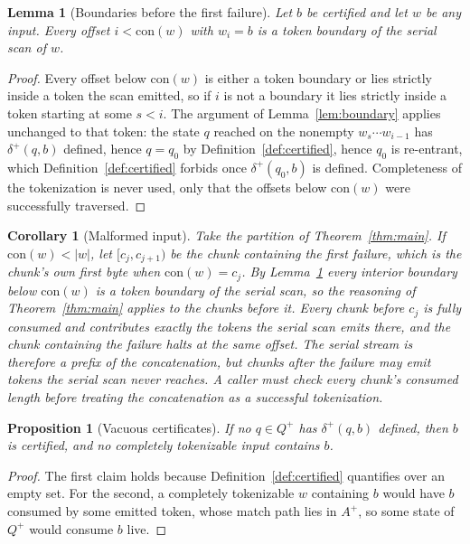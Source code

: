 \documentclass[11pt,a4paper]{article}
\theoremstyle{definition}
\theoremstyle{plain}
\newtheorem{lemma}{Lemma}
\newtheorem{corollary}{Corollary}
\newtheorem{proposition}{Proposition}
\begin{document}
\begin{lemma}[Boundaries before the first failure]
\label{lem:prefix}
Let $b$ be certified and let $w$ be any input. Every offset $i < \mathrm{con}(w)$ with $w_i = b$ is a token boundary
of the serial scan of $w$.
\end{lemma}

\begin{proof}
Every offset below $\mathrm{con}(w)$ is either a token boundary or lies strictly inside a token the scan emitted, so
if $i$ is not a boundary it lies strictly inside a token starting at some $s < i$. The argument of
Lemma~\ref{lem:boundary} applies unchanged to that token: the state $q$ reached on the nonempty $w_s \cdots w_{i-1}$
has $\delta^+(q,b)$ defined, hence $q = q_0$ by Definition~\ref{def:certified}, hence $q_0$ is re-entrant, which
Definition~\ref{def:certified} forbids once $\delta^+(q_0,b)$ is defined. Completeness of the tokenization is never
used, only that the offsets below $\mathrm{con}(w)$ were successfully traversed.
\end{proof}

\begin{corollary}[Malformed input] \label{cor:malformed} Take the partition of Theorem~\ref{thm:main}. If
$\mathrm{con}(w) < |w|$, let $[c_j, c_{j+1})$ be the chunk containing the first failure, which is the chunk's own
first byte when $\mathrm{con}(w) = c_j$. By Lemma~\ref{lem:prefix} every interior boundary below $\mathrm{con}(w)$ is
a token boundary of the serial scan, so the reasoning of Theorem~\ref{thm:main} applies to the chunks before it. Every
chunk before $c_j$ is fully consumed and contributes exactly the tokens the serial scan emits there, and the chunk
containing the failure halts at the same offset. The serial stream is therefore a prefix of the concatenation, but
chunks after the failure may emit tokens the serial scan never reaches. A caller must check every chunk's consumed
length before treating the concatenation as a successful tokenization.
\end{corollary}

\begin{proposition}[Vacuous certificates]
\label{prop:vacuous}
If no $q \in Q^+$ has $\delta^+(q,b)$ defined, then $b$ is certified, and no completely tokenizable input contains
$b$.
\end{proposition}

\begin{proof}
The first claim holds because Definition~\ref{def:certified} quantifies over an empty set. For the second, a
completely tokenizable $w$ containing $b$ would have $b$ consumed by some emitted token, whose match path lies in
$A^+$, so some state of $Q^+$ would consume $b$ live.
\end{proof}
\end{document}
